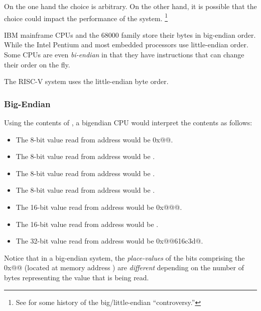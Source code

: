 On the one hand the choice is arbitrary.  On the other hand, it is 
possible that the choice could impact the performance of the system.%
\footnote{See\cite{IEN137} for some history of the big/little-endian ``controversy.''}

IBM mainframe CPUs and the 68000 family store their bytes in big-endian 
order.  While the Intel Pentium and most embedded processors use
little-endian order.  
Some CPUs are even {\em bi-endian} in that they have instructions that
can change their order on the fly. 

The RISC-V system uses the little-endian byte order.

\subsubsection{Big-Endian}
\label{BigEndian}

Using the contents of , a \gls{bigendian}
CPU would interpret the contents as follows:

\begin{itemize}
\item The 8-bit value read from address \colorbox{c_lightblue}{} would be \verb@0x@{\color{red}@}.
\item The 8-bit value read from address  would be .
\item The 8-bit value read from address  would be .
\item The 8-bit value read from address  would be .
\item The 16-bit value read from address \colorbox{c_lightblue}{} would be \verb@0x@{\color{red}@}@.
\item The 16-bit value read from address  would be .
\item The 32-bit value read from address \colorbox{c_lightblue}{} would be \verb@0x@{\color{red}@}\verb@616c3d@.
\end{itemize}

Notice that in a big-endian system, the {\em\gls{place-value}s} of the bits 
comprising the \verb@0x@{\color{red}@}
(located at memory address \colorbox{c_lightblue}{}) are 
{\em different} depending on the number of bytes representing the value that is being read.

